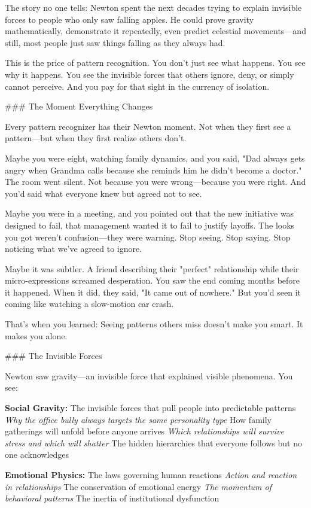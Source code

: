 \documentclass[12pt]{book}
\begin{document}
The story no one tells: Newton spent the next decades trying to explain invisible forces to people who only saw falling apples. He could prove gravity mathematically, demonstrate it repeatedly, even predict celestial movements—and still, most people just saw things falling as they always had.

This is the price of pattern recognition. You don't just see what happens. You see why it happens. You see the invisible forces that others ignore, deny, or simply cannot perceive. And you pay for that sight in the currency of isolation.

\#\#\# The Moment Everything Changes

Every pattern recognizer has their Newton moment. Not when they first see a pattern—but when they first realize others don't.

Maybe you were eight, watching family dynamics, and you said, "Dad always gets angry when Grandma calls because she reminds him he didn't become a doctor." The room went silent. Not because you were wrong—because you were right. And you'd said what everyone knew but agreed not to see.

Maybe you were in a meeting, and you pointed out that the new initiative was designed to fail, that management wanted it to fail to justify layoffs. The looks you got weren't confusion—they were warning. Stop seeing. Stop saying. Stop noticing what we've agreed to ignore.

Maybe it was subtler. A friend describing their "perfect" relationship while their micro-expressions screamed desperation. You saw the end coming months before it happened. When it did, they said, "It came out of nowhere." But you'd seen it coming like watching a slow-motion car crash.

That's when you learned: Seeing patterns others miss doesn't make you smart. It makes you alone.

\#\#\# The Invisible Forces

Newton saw gravity—an invisible force that explained visible phenomena. You see:

\textbf{Social Gravity:} The invisible forces that pull people into predictable patterns
\textit{ Why the office bully always targets the same personality type
} How family gatherings will unfold before anyone arrives
\textit{ Which relationships will survive stress and which will shatter
} The hidden hierarchies that everyone follows but no one acknowledges

\textbf{Emotional Physics:} The laws governing human reactions
\textit{ Action and reaction in relationships
} The conservation of emotional energy
\textit{ The momentum of behavioral patterns
} The inertia of institutional dysfunction
\end{document}
